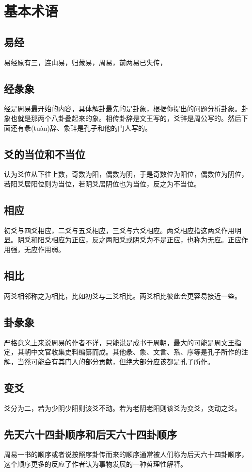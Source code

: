 \documentclass[12pt,oneside]{book}
\begin{document}
\chapter{基本术语}
\section{易经}
易经原有三，连山易，归藏易，周易，前两易已失传，

\section{经彖象}
经是周易最开始的内容，具体解卦最先的是卦象，根据你提出的问题分析卦象。卦象也就是那两个八卦叠起来的象。相传卦辞是文王写的，爻辞是周公写的。然后下面还有彖(tuàn)辞、象辞是孔子和他的门人写的。

\section{爻的当位和不当位}
认为爻位从下往上数，奇数为阳，偶数为阴，于是奇数位为阳位，偶数位为阴位，若阳爻居阳位则为当位，若阴爻居阴位也为当位，反之为不当位。

\section{相应}
初爻与四爻相应，二爻与五爻相应，三爻与六爻相应。两爻相应指这两爻作用明显。阴爻和阳爻相应为正应，反之两阳爻或阴爻为不是正应，也称为无应。正应作用强，无应作用弱。

\section{相比}
两爻相邻称之为相比，比如初爻与二爻相比。两爻相比彼此会更容易接近一些。

\section{卦彖象}
严格意义上来说周易的作者不详，只能说是成书于周朝，最大的可能是周文王指定，其朝中文官收集史料编纂而成。其他彖、象、文言、系、序等是孔子所作的注解，当然可能会有其门人的部分贡献，但绝大部分应该都是孔子所作。

\section{变爻}
爻分为二，若为少阴少阳则该爻不动。若为老阴老阳则该爻为变爻，变动之爻。

\section{先天六十四卦顺序和后天六十四卦顺序}
周易一书的顺序或者说按照序卦传而来的顺序通常被人们称为后天六十四卦顺序，这个顺序更多的反应了作者认为事物发展的一种哲理性解释。
\end{document}
